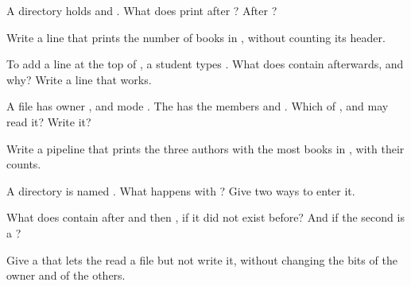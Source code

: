 \begin{exercise}[$\star$]\label{exo:g11:os-and-command-line:4}
A directory holds  and . What does  print after ? After
?
\end{exercise}

\begin{exercise}[$\star$]\label{exo:g11:os-and-command-line:5}
Write a  line that prints the number of books in , without counting its header.
\end{exercise}

\begin{exercise}[$\star\star$]\label{exo:g11:os-and-command-line:6}
To add a line at the top of , a student types . What does
 contain afterwards, and why? Write a  line that works.
\end{exercise}

\begin{exercise}[$\star\star$]\label{exo:g11:os-and-command-line:7}
A file has owner ,   and mode . The  has the members  and
. Which of ,  and  may read it? Write it?
\end{exercise}

\begin{exercise}[$\star\star$]\label{exo:g11:os-and-command-line:8}
Write a pipeline that prints the three authors with the most books in , with their counts.
\end{exercise}

\begin{exercise}[$\star\star$]\label{exo:g11:os-and-command-line:9}
A directory is named . What happens with ? Give two ways to enter it.
\end{exercise}

\begin{exercise}[$\star\star$]\label{exo:g11:os-and-command-line:10}
What does  contain after  and then , if it did not exist
before? And if the second \code{>>} is a \code{>}?
\end{exercise}

\begin{exercise}[$\star\star$]\label{exo:g11:os-and-command-line:11}
Give a   that lets the  read a file but not write it, without changing the bits of the owner
and of the others.
\end{exercise}

